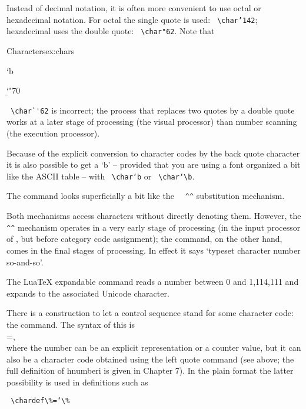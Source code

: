 Instead of decimal notation, it is often more convenient to use octal or hexadecimal notation. For
octal the single quote is used: \verb+ \char’142+; hexadecimal uses the double quote: \verb+ \char"62+. Note that

\begin{texexample}{Characters}{ex:chars}
\bgroup
\ttfamily


\char`b

\char`\b

\char"70

\egroup
\end{texexample}

\verb+ \char`'62+  is incorrect; the process that replaces two quotes by a double quote works at a later
stage of processing (the visual processor) than number scanning (the execution processor).

Because of the explicit conversion to character codes by the back quote character it is also possible
to get a ‘b’ – provided that you are using a font organized a bit like the ASCII table – with \verb+ \char‘b+
or \verb+ \char‘\b+.

The \cmd{\char} command looks superficially a bit like the \verb+  ^^+ substitution mechanism.

Both mechanisms access characters without directly denoting them. However, the \verb+ ^^+ mechanism
operates in a very early stage of processing (in the input processor of \tex, but before category
code assignment); the \cmd{\char} command, on the other hand, comes in the final stages of processing.
In effect it says ‘typeset character number so-and-so’.

\CMDI{\Uchar} The LuaTeX expandable command \cmd{\Uchar} reads a number between 0 and 1,114,111 and expands to the
associated Unicode character. 

\DescribeMacro{\chardef}
There is a construction to let a control sequence stand for some character code: the \cmd{\chardef}
command. The syntax of this is\\
=,\\
where the number can be an explicit representation or a counter value, but it can also be a character
code obtained using the left quote command (see above; the full definition of hnumberi is
given in Chapter 7). In the plain format the latter possibility is used in definitions such as

\verb+ \chardef\%=‘\%+

